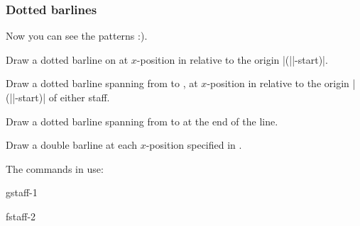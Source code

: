 \subsubsection{Dotted barlines}\label{sec:multistaff:barlines:dotted}
Now you can see the patterns :).
\begin{command}{\tmdottedbarline{}}
  Draw a dotted barline on  at $x$-position  in 
  relative to the origin |(||-start)|.
\end{command}
\begin{command}{\tmdottedbarline*{}}
  Draw a dotted barline spanning from  to 
  , at $x$-position  in relative to 
  the origin |(||-start)| of either staff.
\end{command}
\begin{command}{\tmdottedbarlineendline{}}
  Draw a dotted barline spanning from  to 
   at the end of the line.
\end{command}
\begin{command}{\tmdottedbarlineinline{}}
  Draw a double barline at each $x$-position specified in .
\end{command}
The commands in use:
\begin{codeexample}[]
\begin{tmline}%
\begin{tmstaff}{g}{staff-1}\end{tmstaff}%
\begin{tmstaff}{f}{staff-2}
\end{tmstaff}%
%
%
%
%
\end{tmline}
\end{codeexample}
